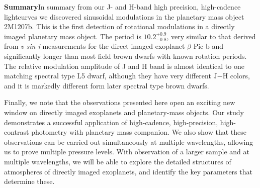 \documentclass[12pt]{article}
\newcommand{\bpic}{$\beta$ Pic}
\begin{document}

\textbf{Summary}In summary from our J- and H-band high precision,
high-cadence lightcurves we discovered sinusoidal modulations in the  planetary mass object
2M1207b. This is the first detection of rotational modulations in a
directly imaged planetary mass object.  
The period is  $10.2^{+0.9}_{-0.8}$, very similar to that derived from
{\em v sin i} measurements for  the direct imaged exoplanet \bpic{} b and significantly longer than
most field brown dwarfs with known rotation periods. The
relative modulation amplitude of J and H band is almost identical to
one matching spectral type L5 dwarf, although they have very different
J$-$H colors, and it is markedly different form later spectral type
brown dwarfs.

Finally, we note that the observations presented here open an exciting
new window on directly imaged exoplanets and planetary-mass
objects. Our study demonstrates a successful application of high-cadence,
high-precision, high-contrast photometry with planetary mass
companion. We also show that these observations can be carried out simultaneously
at multiple wavelengths, allowing us to prove multiple pressure
levels. With observation of a larger sample and at multiple wavelengths, we will be
able to explore  the detailed structures of atmospheres of directly
imaged exoplanets, and identify the key parameters that determine these.




\end{document}
